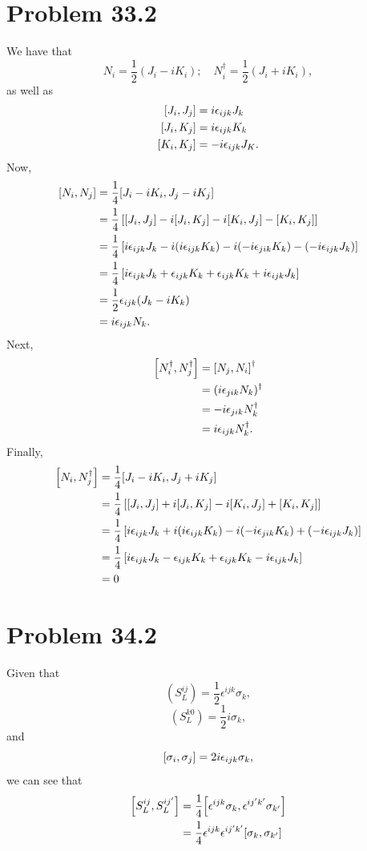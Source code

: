 \documentclass[12pt]{article}
\begin{document}
\section*{Problem 33.2}
We have that
\[ N_i = \frac{1}{2}(J_i - iK_i); \quad N_i^\dag = \frac{1}{2}(J_i + iK_i), \]
as well as
\begin{align*}
    \comm{J_i}{J_j} &= i\epsilon_{ijk}J_k \\ 
    \comm{J_i}{K_j} &= i\epsilon_{ijk}K_k \\
    \comm{K_i}{K_j} &= -i\epsilon_{ijk}J_K.
\end{align*}
Now,
\begin{align*}
    \comm{N_i}{N_j} &= \frac{1}{4}\comm{J_i - iK_i}{J_j - iK_j} \\
    &= \frac{1}{4}\left[\comm{J_i}{J_j} - i\comm{J_i}{K_j} - i\comm{K_i}{J_j} - \comm{K_i}{K_j}\right] \\
    &= \frac{1}{4}\left[i\epsilon_{ijk}J_k - i(i\epsilon_{ijk}K_k) -i(-i\epsilon_{jik}K_k) - (-i\epsilon_{ijk}J_k)\right] \\
    &= \frac{1}{4}\left[i\epsilon_{ijk}J_k + \epsilon_{ijk}K_k + \epsilon_{ijk}K_k + i\epsilon_{ijk}J_k\right] \\
    &= \frac{1}{2}\epsilon_{ijk}(J_k - iK_k) \\
    &= i\epsilon_{ijk}N_k.
\end{align*}
Next,
\begin{align*}
    \comm{N_i^\dag}{N_j^\dag} &= \comm{N_j}{N_i}^\dag \\
    &= (i\epsilon_{jik}N_k)^\dag \\ 
    &= -i\epsilon_{jik}N_k^\dag \\
    &= i\epsilon_{ijk}N_k^\dag.
\end{align*}
Finally,
\begin{align*}
    \comm{N_i}{N_j^\dag} &= \frac{1}{4}\comm{J_i - iK_i}{J_j + iK_j} \\
    &= \frac{1}{4}\left[\comm{J_i}{J_j} + i\comm{J_i}{K_j} - i\comm{K_i}{J_j} + \comm{K_i}{K_j}\right] \\
    &= \frac{1}{4}\left[i\epsilon_{ijk}J_k + i(i\epsilon_{ijk}K_k) -i(-i\epsilon_{jik}K_k) + (-i\epsilon_{ijk}J_k)\right] \\
    &= \frac{1}{4}\left[i\epsilon_{ijk}J_k - \epsilon_{ijk}K_k + \epsilon_{ijk}K_k - i\epsilon_{ijk}J_k\right] \\
    &= 0
\end{align*}


\section*{Problem 34.2}
Given that
\[ \left(S_L^{ij}\right) = \frac{1}{2}\epsilon^{ijk}\sigma_k, \]
\[ \left(S_L^{k0}\right) = \frac{1}{2}i\sigma_k, \]
and
\[ \comm{\sigma_i}{\sigma_j} = 2i\epsilon_{ijk}\sigma_k, \]
we can see that
\begin{align*}
    \comm{S_L^{ij}}{S_L^{ij'}} &= \frac{1}{4}\comm{\epsilon^{ijk}\sigma_k}{\epsilon^{ij'k'}\sigma_{k'}} \\
    &= \frac{1}{4}\epsilon^{ijk}\epsilon^{ij'k'}\comm{\sigma_k}{\sigma_{k'}}
\end{align*}
\end{document}
